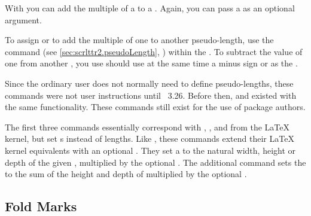 With  you can add the multiple of a  to a
. Again, you can pass a  as an optional
argument.

To assign or to add the multiple of one  to another
pseudo-length, use the  command (see
\autoref{sec:scrlttr2.pseudoLength}, )
within the . To subtract the value of one 
from another , you use should use at the same time a
minus sign or  as the .

%
%
Since the ordinary user does not normally need to define pseudo-lengths, these
commands were not user instructions until \KOMAScript~3.26. Before then,
 and  existed with the
same functionality. These commands still exist for the use of package authors.%
\EndIndexGroup

\begin{Declaration}
\end{Declaration}
The first three
commands essentially correspond with ,
, and  from the \LaTeX{} kernel, but set
s instead of lengths. Like 
, these commands extend their \LaTeX{}
kernel equivalents with an optional . They set a
 to the natural width, height or depth of the given
, multiplied by the optional . The additional
command  sets the  to the
sum of the height and depth of  multiplied by the optional
.%
\EndIndexGroup


\subsection{Fold Marks}
\BeginIndexGroup
{}%

